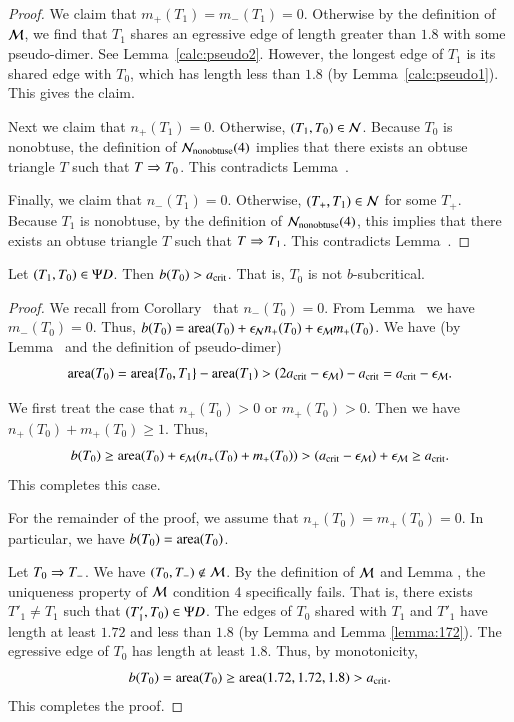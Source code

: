 \begin{proof}  
  We claim that $m_+(T_1)=m_-(T_1)=0$.  Otherwise by the definition of $\mathcal M$, we find that $T_1$ shares an
  egressive edge of length greater than $1.8$ with some pseudo-dimer. See Lemma~\ref{calc:pseudo2}.
  However, the longest edge of $T_1$ is its shared edge with $T_0$,
  which has length less than $1.8$ (by Lemma~\ref{calc:pseudo1}).  This gives the claim.

  Next we claim that $n_+(T_1)=0$.  Otherwise, $(T_1,T_0)\in \mathcal N$.
  Because $T_0$ is nonobtuse, the definition of $\mathcal N_{\text{nonobtuse}}(4)$
  implies that there exists an obtuse
  triangle $T$ such that $T\Rightarrow T_0$.  This contradicts
  Lemma~.

  Finally, we claim that $n_-(T_1)=0$.  Otherwise, $(T_+,T_1)\in \mathcal N$ for
  some $T_+$.  Because $T_1$ is nonobtuse, by the definition of $\mathcal N_{\text{nonobtuse}}(4)$, this implies that there exists
  an obtuse triangle $T$ such that $T\Rightarrow T_1$.  This contradicts
  Lemma~.
\end{proof}

\begin{lemma}  
  Let $(T_1,T_0)\in\Psi D$.  Then $b(T_0) > a_\text{crit}$.  That is, $T_0$ is
  not $b$-subcritical.
\end{lemma}

\begin{proof}
  We recall from Corollary~ that $n_-(T_0)=0$.  From
  Lemma~ we have $m_-(T_0)=0$.  Thus, $b(T_0) =
  {\operatorname{area}}(T_0) + \epsilon_{\mathcal N} n_+(T_0) + \epsilon_{\mathcal M} m_+(T_0)$.  We have
  (by Lemma~ and the definition of pseudo-dimer)
\[
{\operatorname{area}}(T_0) = {\operatorname{area}}\{T_0,T_1\} - {\operatorname{area}}(T_1) 
> (2a_\text{crit}-\epsilon_{\mathcal M}) -a_\text{crit} = a_\text{crit} - \epsilon_{\mathcal M}.
\]

We first treat the case that $n_+(T_0)>0$ or $m_+(T_0)>0$.  Then we
have $n_+(T_0)+m_+(T_0)\ge 1$.  Thus,
\[
b(T_0) \ge {\operatorname{area}}(T_0) + \epsilon_{\mathcal M} (n_+(T_0)+m_+(T_0)) > (a_\text{crit} - \epsilon_{\mathcal M})
+ \epsilon_{\mathcal M} \ge a_\text{crit}.
\]
This completes this case.

For the remainder of the proof, we assume that $n_+(T_0)=m_+(T_0)=0$.  In
particular, we have $b(T_0) = {\operatorname{area}}(T_0)$.

Let $T_0\Rightarrow T_-$.  We have $(T_0,T_-)\not\in\mathcal M$.  By the definition of $\mathcal M$ and Lemma , 
the uniqueness property of $\mathcal M$ condition 4 specifically fails.  That is,
there exists $T'_1\ne T_1$ such that $(T'_1,T_0)\in\Psi D$.  The edges of
$T_0$ shared with $T_1$ and $T'_1$ have length at least $1.72$ and
less than $1.8$ (by Lemma  and Lemma \ref{lemma:172}).  The egressive edge of $T_0$ has length at least
$1.8$.  Thus, by monotonicity,
\[
b(T_0) = {\operatorname{area}} (T_0) \ge {\operatorname{area}}(1.72,1.72,1.8) > a_\text{crit}.
\]
This completes the proof.
\end{proof}

